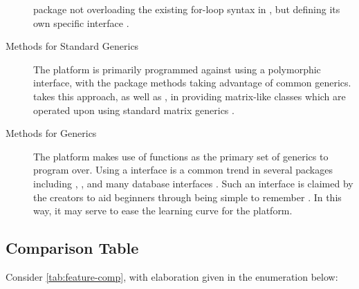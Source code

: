 \begin{description}
    package not overloading the existing for-loop syntax in \R{}, but defining
    its own specific interface \cite{microsoft20}.
  \item[Methods for Standard Generics]
    The platform is primarily programmed against using a polymorphic
    interface, with the package methods taking advantage of common generics.
     takes this approach, as well as , in providing
    matrix-like classes which are operated upon using standard matrix
    generics \cites{pbdDMATpackage,kane13:bigmemory}.
  \item[Methods for \pkg{dplyr} Generics]
    The platform makes use of  functions as the primary set of generics
    to program over. Using a  interface is a common trend in several \R{}
    packages including , , and many database interfaces
    \cites{luraschi20,zj20}. Such an interface is claimed by the 
    creators to aid beginners through being simple to remember
    \cite{wickham2019welcome}. In this way, it may serve to ease the
    learning curve for the platform.
\end{description}

\subsection{Comparison Table}\label{subsec:comp-tab}


Consider \cref{tab:feature-comp}, with elaboration given in the enumeration below:

